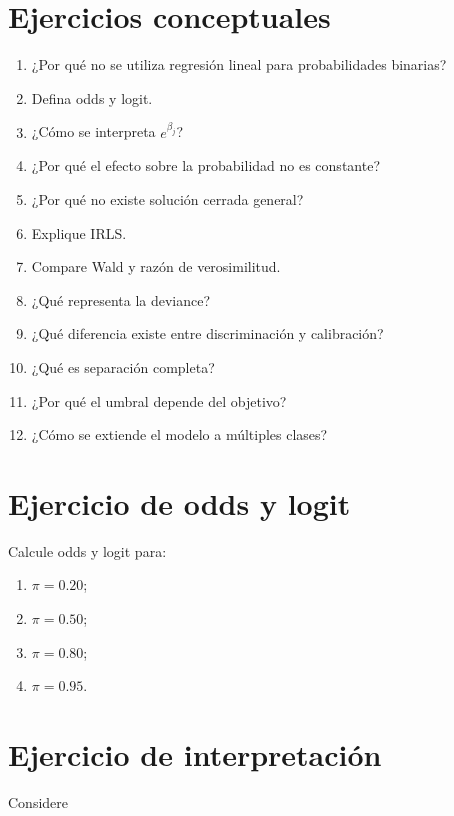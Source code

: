 \documentclass[
  spanish,
  11pt,
  letterpaper,
  DIV=11,
  numbers=noendperiod]{scrreprt}
\providecommand{\tightlist}{%
  \setlength{\itemsep}{0pt}\setlength{\parskip}{0pt}}
\theoremstyle{definition}
\theoremstyle{plain}
\theoremstyle{definition}
\theoremstyle{remark}
\begin{document}
\section{Ejercicios conceptuales}\label{ejercicios-conceptuales-10}

\begin{enumerate}
\def\labelenumi{\arabic{enumi}.}
\tightlist
\item
  ¿Por qué no se utiliza regresión lineal para probabilidades binarias?
\item
  Defina odds y logit.
\item
  ¿Cómo se interpreta \(e^{\beta_j}\)?
\item
  ¿Por qué el efecto sobre la probabilidad no es constante?
\item
  ¿Por qué no existe solución cerrada general?
\item
  Explique IRLS.
\item
  Compare Wald y razón de verosimilitud.
\item
  ¿Qué representa la deviance?
\item
  ¿Qué diferencia existe entre discriminación y calibración?
\item
  ¿Qué es separación completa?
\item
  ¿Por qué el umbral depende del objetivo?
\item
  ¿Cómo se extiende el modelo a múltiples clases?
\end{enumerate}

\section{Ejercicio de odds y logit}\label{ejercicio-de-odds-y-logit}

Calcule odds y logit para:

\begin{enumerate}
\def\labelenumi{\arabic{enumi}.}
\tightlist
\item
  \(\pi=0.20\);
\item
  \(\pi=0.50\);
\item
  \(\pi=0.80\);
\item
  \(\pi=0.95\).
\end{enumerate}

\section{Ejercicio de
interpretación}\label{ejercicio-de-interpretaciuxf3n-1}

Considere
\end{document}

